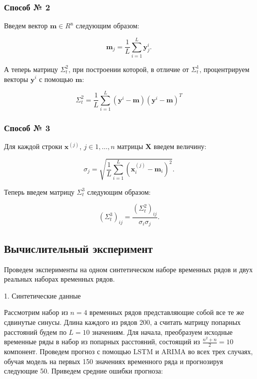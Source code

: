 \documentclass{article}
\begin{document}
\subsubsection{Способ № 2}


Введем вектор $\mathbf{m} \in R^{\text{n}}$ следующим образом:


\begin{equation}
\mathbf{m}_j = \dfrac1L \sum\limits_{i = 1}^{L} \textbf{y}^{i}_j.
\end{equation}


А теперь матрицу $\Sigma_t^{2}$, при построении которой, в отличие от $\Sigma_t^{1}$, процентрируем векторы $\textbf{y}^{i}$ с помощью  $\textbf{m}$: 


\begin{equation}
\Sigma_t^{2} = \dfrac{1}{L}\sum\limits_{i = 1}^{L} (\textbf{y}^{i} - \textbf{m}) (\textbf{y}^{i} - \textbf{m})^T
\end{equation}

\subsubsection{Способ № 3}

Для каждой строки $\textbf{x}^{(j)}$, $j \in {1, \ldots, n}$ матрицы $\textbf{X}$ введем величину:


\begin{equation}
\sigma_j = \sqrt{\dfrac{1}{L} \sum\limits_{i = 1}^L (\textbf{x}^{(j)}_i - \textbf{m}_i)^2}.
\end{equation}


Теперь введем матрицу $\Sigma_t^3$ следующим образом:


\begin{equation}
(\Sigma_t^{3})_{ij} = \dfrac{(\Sigma_t^{2})_{ij}}{\sigma_i \sigma_j}.
\end{equation}

\subsection{Вычислительный эксперимент}

Проведем эксперименты на одном синтетическом наборе временных рядов и двух реальных наборах временных рядов. 

1. Синтетические данные

Рассмотрим набор из $n = 4$ временных рядов представляющие собой все те же сдвинутые синусы. Длина каждого из рядов 200, а считать матрицу попарных расстояний будем по $L = 10$ значениям. Для начала, преобразуем исходные временные ряды в набор из попарных расстояний, состоящий из $\frac{n^2 + n}{2} = 10$ компонент. Проведем прогноз с помощью LSTM и ARIMA во всех трех случаях, обучая модель на первых 150 значениях временного ряда и прогнозируя следующие 50. Приведем средние ошибки прогноза:
\end{document}
